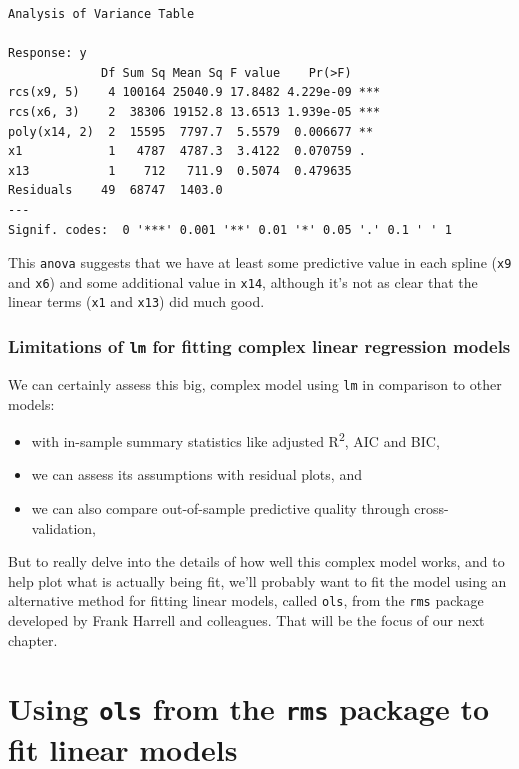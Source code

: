 \documentclass[]{book}
\providecommand{\tightlist}{%
  \setlength{\itemsep}{0pt}\setlength{\parskip}{0pt}}
\theoremstyle{definition}
\theoremstyle{definition}
\theoremstyle{definition}
\theoremstyle{remark}
\begin{document}
\begin{verbatim}
Analysis of Variance Table

Response: y
             Df Sum Sq Mean Sq F value    Pr(>F)    
rcs(x9, 5)    4 100164 25040.9 17.8482 4.229e-09 ***
rcs(x6, 3)    2  38306 19152.8 13.6513 1.939e-05 ***
poly(x14, 2)  2  15595  7797.7  5.5579  0.006677 ** 
x1            1   4787  4787.3  3.4122  0.070759 .  
x13           1    712   711.9  0.5074  0.479635    
Residuals    49  68747  1403.0                      
---
Signif. codes:  0 '***' 0.001 '**' 0.01 '*' 0.05 '.' 0.1 ' ' 1
\end{verbatim}

This \texttt{anova} suggests that we have at least some predictive value
in each spline (\texttt{x9} and \texttt{x6}) and some additional value
in \texttt{x14}, although it's not as clear that the linear terms
(\texttt{x1} and \texttt{x13}) did much good.

\subsection{\texorpdfstring{Limitations of \texttt{lm} for fitting
complex linear regression
models}{Limitations of lm for fitting complex linear regression models}}\label{limitations-of-lm-for-fitting-complex-linear-regression-models}

We can certainly assess this big, complex model using \texttt{lm} in
comparison to other models:

\begin{itemize}
\tightlist
\item
  with in-sample summary statistics like adjusted R\textsuperscript{2},
  AIC and BIC,
\item
  we can assess its assumptions with residual plots, and
\item
  we can also compare out-of-sample predictive quality through
  cross-validation,
\end{itemize}

But to really delve into the details of how well this complex model
works, and to help plot what is actually being fit, we'll probably want
to fit the model using an alternative method for fitting linear models,
called \texttt{ols}, from the \texttt{rms} package developed by Frank
Harrell and colleagues. That will be the focus of our next chapter.

\chapter{\texorpdfstring{Using \texttt{ols} from the \texttt{rms}
package to fit linear
models}{Using ols from the rms package to fit linear models}}\label{using-ols-from-the-rms-package-to-fit-linear-models}
\end{document}
